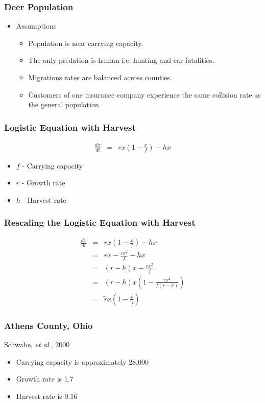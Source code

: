\begin{frame}
    \frametitle{Deer Population}
    \begin{itemize}
    	\item Assumptions
		\begin{itemize}
    		\item Population is near carrying capacity.
    		\item The only predation is human i.e. hunting and car fatalities.
    		\item Migrations rates are balanced across counties.
		\item Customers of one insurance company experience the same collision rate as the general population.
    		\end{itemize}
    \end{itemize}
\end{frame}

\begin{frame}
    \frametitle{Logistic Equation with Harvest}
	\vspace{-1cm}
	\begin{eqnarray*}
		\frac{dx}{dt} &=& rx \left( 1-\frac{x}{f} \right) -hx
	\end{eqnarray*}
	\begin{itemize}
		\item $f$ - Carrying capacity
		\item $r$ - Growth rate
		\item $h$ - Harvest rate
	\end{itemize}
\end{frame}

\begin{frame}
    \frametitle{Rescaling the Logistic Equation with Harvest}
	\vspace{-1cm}
	\begin{eqnarray*}
		\frac{dx}{dt} &=& rx \left( 1-\frac{x}{f} \right) -hx\\
		 &=& rx-\frac{rx^{2}}{f}-hx\\
		 &=& (r-h)x-\frac{rx^{2}}{f}\\
		 &=& (r-h)x \left(1-\frac{rx^{2}}{f(r-h)} \right)\\
		 &=& \tilde{r}x \left( 1-\frac{x}{\tilde{f}} \right)		
	\end{eqnarray*}
\end{frame}

\begin{frame}
    \frametitle{Athens County, Ohio}
Schwabe, \emph{et al.}, 2000
	\begin{itemize}
		\item Carrying capacity is approximately 28,000
		\item Growth rate is 1.7
		\item Harvest rate is 0.16
	\end{itemize}
\end{frame}






